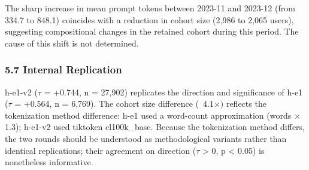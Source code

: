 \begin{table}[htbp]
\centering
{}
\end{table}

The sharp increase in mean prompt tokens between 2023-11 and 2023-12 (from 334.7 to 848.1) coincides with a reduction in cohort size (2,986 to 2,065 users), suggesting compositional changes in the retained cohort during this period. The cause of this shift is not determined.

\subsubsection{5.7 Internal Replication}

h-e1-v2 ($\tau$ = +0.744, n = 27,902) replicates the direction and significance of h-e1 ($\tau$ = +0.564, n = 6,769). The cohort size difference (~4.$1\times )$ reflects the tokenization method difference: h-e1 used a word-count approximation (words $\times$ 1.3); h-e1-v2 used tiktoken cl100k\_base. Because the tokenization method differs, the two rounds should be understood as methodological variants rather than identical replications; their agreement on direction ($\tau$ > 0, p < 0.05) is nonetheless informative.

